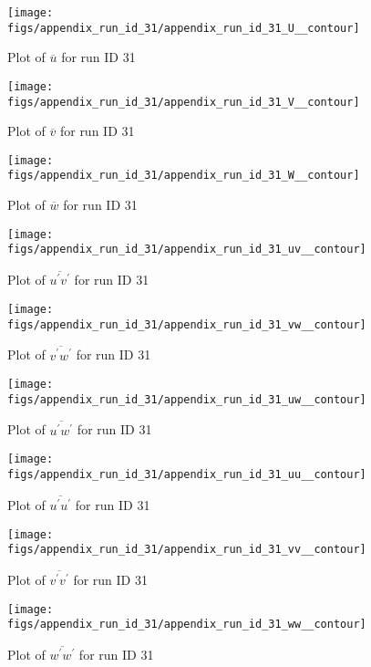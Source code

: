 \begin{figure}[H]
\centering
\texttt{[image: figs/appendix\_run\_id\_31/appendix\_run\_id\_31\_U\_\_contour]}
\caption{Plot of $\overline{u}$ for run ID 31}
\label{fig:appendix_run_id_31_U__contour}
\end{figure}


\begin{figure}[H]
\centering
\texttt{[image: figs/appendix\_run\_id\_31/appendix\_run\_id\_31\_V\_\_contour]}
\caption{Plot of $\overline{v}$ for run ID 31}
\label{fig:appendix_run_id_31_V__contour}
\end{figure}


\begin{figure}[H]
\centering
\texttt{[image: figs/appendix\_run\_id\_31/appendix\_run\_id\_31\_W\_\_contour]}
\caption{Plot of $\overline{w}$ for run ID 31}
\label{fig:appendix_run_id_31_W__contour}
\end{figure}


\begin{figure}[H]
\centering
\texttt{[image: figs/appendix\_run\_id\_31/appendix\_run\_id\_31\_uv\_\_contour]}
\caption{Plot of $\overline{u^\prime v^\prime}$ for run ID 31}
\label{fig:appendix_run_id_31_uv__contour}
\end{figure}


\begin{figure}[H]
\centering
\texttt{[image: figs/appendix\_run\_id\_31/appendix\_run\_id\_31\_vw\_\_contour]}
\caption{Plot of $\overline{v^\prime w^\prime}$ for run ID 31}
\label{fig:appendix_run_id_31_vw__contour}
\end{figure}


\begin{figure}[H]
\centering
\texttt{[image: figs/appendix\_run\_id\_31/appendix\_run\_id\_31\_uw\_\_contour]}
\caption{Plot of $\overline{u^\prime w^\prime}$ for run ID 31}
\label{fig:appendix_run_id_31_uw__contour}
\end{figure}


\begin{figure}[H]
\centering
\texttt{[image: figs/appendix\_run\_id\_31/appendix\_run\_id\_31\_uu\_\_contour]}
\caption{Plot of $\overline{u^\prime u^\prime}$ for run ID 31}
\label{fig:appendix_run_id_31_uu__contour}
\end{figure}


\begin{figure}[H]
\centering
\texttt{[image: figs/appendix\_run\_id\_31/appendix\_run\_id\_31\_vv\_\_contour]}
\caption{Plot of $\overline{v^\prime v^\prime}$ for run ID 31}
\label{fig:appendix_run_id_31_vv__contour}
\end{figure}


\begin{figure}[H]
\centering
\texttt{[image: figs/appendix\_run\_id\_31/appendix\_run\_id\_31\_ww\_\_contour]}
\caption{Plot of $\overline{w^\prime w^\prime}$ for run ID 31}
\label{fig:appendix_run_id_31_ww__contour}
\end{figure}


